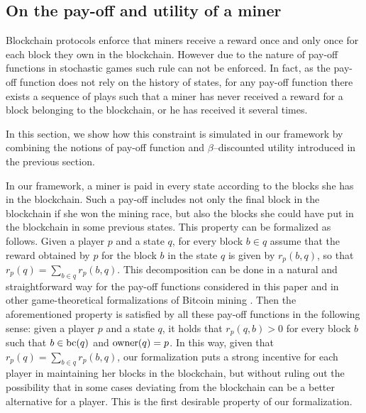\subsection{On the pay-off and utility of a miner}\label{sec-pay-ut}
Blockchain protocols enforce that miners receive a reward once and only once for each block they own
in the blockchain. However due to the nature of pay-off functions in stochastic games such rule can not be enforced. In fact, as the pay-off function does not rely on the history of states, for any pay-off function there exists a sequence of plays such that a miner has never received a reward for a block belonging to the blockchain, or he has received it several times. 

In this section, we show how this constraint is simulated in our framework by combining the notions of pay-off function and $\beta$--discounted utility introduced in the previous section.  

In our framework, a miner is paid in every state according to the blocks she has in the blockchain. Such a pay-off includes not only the final block in the blockchain if she won the mining race, but also the blocks she could have put in the blockchain in some previous states. This property can be formalized as follows.
Given a player $p$ and a state $q$, for every block $b \in q$ assume that the reward obtained by $p$ for the block $b$ in the state $q$ is given by $r_p(b,q)$, so that $r_p(q) = \sum_{b \in q} r_p(b,q)$. This decomposition can be done in a natural and straightforward way for the pay-off functions considered in this paper and in other game-theoretical formalizations of Bitcoin mining \cite{mininggames:2016}. Then the aforementioned property is satisfied by all these pay-off functions in the following sense: given a player $p$ and a state $q$, it holds that $r_p(q,b) > 0$ for every block $b$ such that $b \in \text{bc}(q)$ and $\text{\rm owner}(q) = p$. 
In this way, given that $r_p(q) = \sum_{b \in q} r_p(b,q)$, our formalization puts a strong incentive for each player in maintaining her blocks in the blockchain, but without ruling out the possibility that in some cases deviating from the blockchain can be a better alternative for a player. This is the first desirable property of our formalization.

